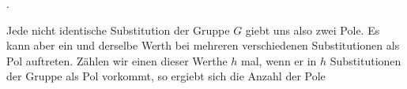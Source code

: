 \par{}.\ 

Jede nicht identische Substitution der Gruppe $G$ giebt uns
also zwei Pole. Es kann aber ein und derselbe Werth bei
mehreren verschiedenen Substitutionen als Pol auftreten. Zählen
wir einen dieser Werthe $h$ mal, wenn er in $h$ Substitutionen der
Gruppe als Pol vorkommt, so ergiebt sich die Anzahl der Pole
